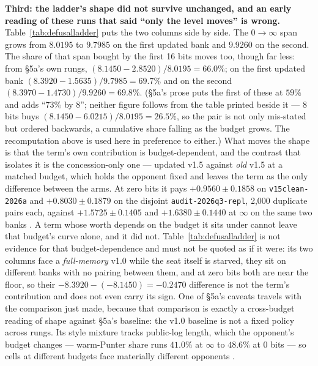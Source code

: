 \documentclass[11pt]{article}
\newcommand{\code}[1]{\texttt{#1}}
\begin{document}
\textbf{Third: the ladder's shape did not survive unchanged, and an early reading of these runs
that said ``only the level moves'' is wrong.} Table~\ref{tab:defusalladder} puts the two columns
side by side. The $0 \to \infty$ span grows from $8.0195$ to $9.7985$ on the first updated bank
and $9.9260$ on the second. The share of that span bought by the first 16 bits moves too, though
far less: from \S5a's own rungs, $(8.1450 - 2.8520)/8.0195 = 66.0\%$; on the first updated bank
$(8.3920 - 1.5635)/9.7985 = 69.7\%$ and on the second $(8.3970 - 1.4730)/9.9260 = 69.8\%$. (\S5a's
prose puts the first of these at $59\%$ and adds ``$73\%$ by 8''; neither figure follows from the
table printed beside it --- 8 bits buys $(8.1450 - 6.0215)/8.0195 = 26.5\%$, so the pair is not
only mis-stated but ordered backwards, a cumulative share falling as the budget grows. The
recomputation above is used here in preference to either.) What moves the shape is that the
term's own contribution is budget-dependent, and the contrast that isolates it is the
concession-only one --- updated v1.5 against \emph{old} v1.5 at a matched budget, which holds the
opponent fixed and leaves the term as the only difference between the arms. At zero bits it pays
$+0.9560 \pm 0.1858$ on \code{v15clean-2026a} and $+0.8030 \pm 0.1879$ on the disjoint
\code{audit-2026q3-repl}, 2{,}000 duplicate pairs each, against $+1.5725 \pm 0.1405$ and
$+1.6380 \pm 0.1440$ at $\infty$ on the same two banks \cite{v15clean}. A term whose worth depends
on the budget it sits under cannot leave that budget's curve alone, and it did not.
Table~\ref{tab:defusalladder} is not evidence for that budget-dependence and must not be quoted
as if it were: its two columns face a \emph{full-memory} v1.0 while the seat itself is starved,
they sit on different banks with no pairing between them, and at zero bits both are near the
floor, so their $-8.3920 - (-8.1450) = -0.2470$ difference is not the term's contribution and
does not even carry its sign. One of \S5a's caveats travels with the comparison just made,
because that comparison is
exactly a cross-budget reading of shape against \S5a's baseline: the v1.0 baseline is not a fixed
policy across rungs. Its style mixture tracks public-log length, which the opponent's budget
changes --- warm-Punter share runs $41.0\%$ at $\infty$ to $48.6\%$ at 0 bits --- so cells at
different budgets face materially different opponents \cite{bounded}.
\end{document}
